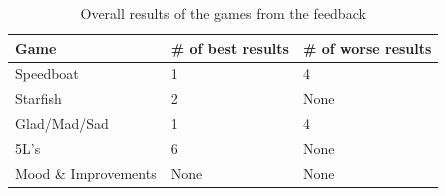 \begin{table}[!htbp]
	\caption{Overall results of the games from the feedback}
	\label{tab:groups-overallConclusion}
	\begin{tabularx}{\textwidth}{|X|X|X|}
	\hline
		Game & \# of best results & \# of worse results\\ \hline
		Speedboat & 1 & 4 \\ \hline
		Starfish & 2 & None \\ \hline
        Glad/Mad/Sad & 1 & 4 \\ \hline
        5L's & 6 & None \\ \hline
        Mood \& Improvements & None & None\\ \hline
	\end{tabularx}
\end{table}
